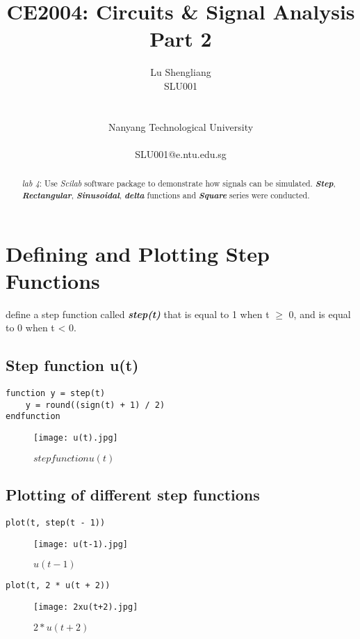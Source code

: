 \documentclass[12pt,fleqn]{article}
\title{CE2004: Circuits \& Signal Analysis Part 2}
\author{
  Lu Shengliang \\
  SLU001\\
  \Organization{} \\
  \vspace*{-10mm} \\
  Nanyang Technological University \\
  \vspace*{-10mm} \\
  SLU001@e.ntu.edu.sg
}
\begin{document}
\lstset{language=Scilab}
\maketitle

\begin{abstract}
\emph{lab 4}: Use \emph{Scilab} software package to demonstrate how signals can be simulated. \textbf{\emph{Step}}, \textbf{\emph{Rectangular}}, \textbf{\emph{Sinusoidal}}, \textbf{\emph{delta}} functions and \textbf{\emph{Square}} series were conducted.   
\end{abstract}


\section{Defining and Plotting Step Functions}
define a step function called \emph{\textbf{step(t)}} that is equal to 1 when t $\geq$ 0, and is equal to 0 when t \textless{} 0.
\subsection{Step function u(t)}
\begin{lstlisting}[frame=single]
function y = step(t)
    y = round((sign(t) + 1) / 2)
endfunction
\end{lstlisting}
\begin{figure}[H]
\centering
\texttt{[image: u(t).jpg]}
\caption{$step function u(t)$}
\end{figure}

\subsection{Plotting of different step functions}
\begin{lstlisting}[frame=single]
plot(t, step(t - 1))
\end{lstlisting}
\begin{figure}[H]
\centering
\texttt{[image: u(t-1).jpg]}
\caption{$u(t-1)$}
\end{figure}

\begin{lstlisting}[frame=single]
plot(t, 2 * u(t + 2))
\end{lstlisting}
\begin{figure}[H]
\centering
\texttt{[image: 2xu(t+2).jpg]}
\caption{$2*u(t+2)$}
\end{figure}
\end{document}
